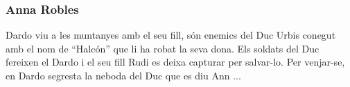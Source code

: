 \begin{news}
\subsubsection*
{Anna Robles}
Dardo viu a les muntanyes amb el seu fill, són enemics del Duc Urbis conegut amb el nom de “Halcón” que li ha robat la seva dona. Els soldats del Duc fereixen el Dardo  i el seu fill Rudi es deixa capturar per salvar-lo.
Per venjar-se, en Dardo segresta la neboda del Duc que es  diu Ann ...




\end{news}
